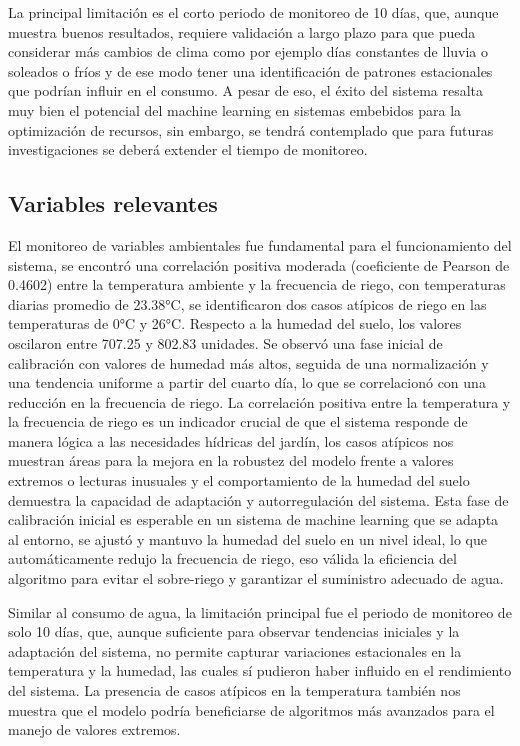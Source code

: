 \documentclass[pdflatex,sn-mathphys-num]{sn-jnl}%
\theoremstyle{thmstyleone}%
\theoremstyle{thmstyletwo}%
\theoremstyle{thmstylethree}%
\begin{document}
La principal limitación es el corto periodo de monitoreo de 10 días, que, aunque muestra buenos resultados, requiere validación a largo plazo para que pueda considerar más cambios de clima como por ejemplo días constantes de lluvia o soleados o fríos y de ese modo tener una identificación de patrones estacionales que podrían influir en el consumo. A pesar de eso, el éxito del sistema resalta muy bien el potencial del machine learning en sistemas embebidos para la optimización de recursos, sin embargo, se tendrá contemplado que para futuras investigaciones se deberá extender el tiempo de monitoreo.

\subsection{Variables relevantes}
El monitoreo de variables ambientales fue fundamental para el funcionamiento del sistema, se encontró una correlación positiva moderada (coeficiente de Pearson de 0.4602) entre la temperatura ambiente y la frecuencia de riego, con temperaturas diarias promedio de 23.38°C, se identificaron dos casos atípicos de riego en las temperaturas de 0°C y 26°C. Respecto a la humedad del suelo, los valores oscilaron entre 707.25 y 802.83 unidades. Se observó una fase inicial de calibración con valores de humedad más altos, seguida de una normalización y una tendencia uniforme a partir del cuarto día, lo que se correlacionó con una reducción en la frecuencia de riego.
La correlación positiva entre la temperatura y la frecuencia de riego es un indicador crucial de que el sistema responde de manera lógica a las necesidades hídricas del jardín, los casos atípicos nos muestran áreas para la mejora en la robustez del modelo frente a valores extremos o lecturas inusuales y el comportamiento de la humedad del suelo demuestra la capacidad de adaptación y autorregulación del sistema. Esta fase de calibración inicial es esperable en un sistema de machine learning que se adapta al entorno, se ajustó y mantuvo la humedad del suelo en un nivel ideal, lo que automáticamente redujo la frecuencia de riego, eso válida la eficiencia del algoritmo para evitar el sobre-riego y garantizar el suministro adecuado de agua.

Similar al consumo de agua, la limitación principal fue el periodo de monitoreo de solo 10 días, que, aunque suficiente para observar tendencias iniciales y la adaptación del sistema, no permite capturar variaciones estacionales en la temperatura y la humedad, las cuales sí pudieron haber influido en el rendimiento del sistema. La presencia de casos atípicos en la temperatura también nos muestra que el modelo podría beneficiarse de algoritmos más avanzados para el manejo de valores extremos.
\end{document}
